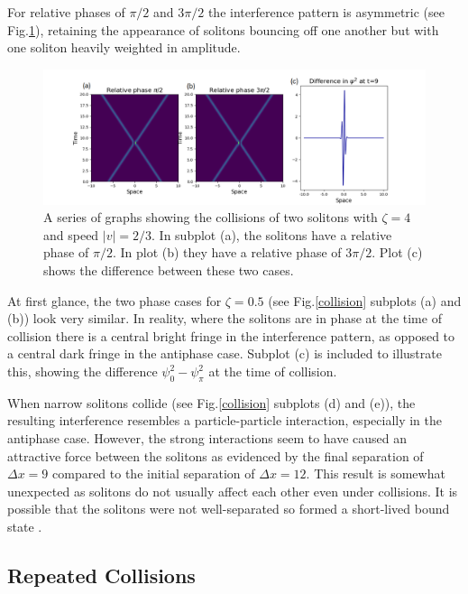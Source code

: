 \documentclass[10pt, twocolumn]{revtex4}    %
\begin{document}
For relative phases of $\pi/2$ and $3\pi/2$ the interference pattern is asymmetric (see Fig.\ref{asymmetric}), retaining the appearance of solitons bouncing off one another but with one soliton heavily weighted in amplitude. 

\begin{figure}
\includegraphics[width=\textwidth]{asymmetrical_collision.png}
\caption{A series of graphs showing the collisions of two solitons with $\zeta=4$ and speed $|v|=2/3$. In subplot (a), the solitons have a relative phase of $\pi/2$. In plot (b) they have a relative phase of $3\pi/2$. Plot (c) shows the difference between these two cases.}
\label{asymmetric}
\end{figure}

At first glance, the two phase cases for $\zeta=0.5$ (see Fig.\ref{collision} subplots (a) and (b)) look very similar. In reality, where the solitons are in phase at the time of collision there is a central bright fringe in the interference pattern, as opposed to a central dark fringe in the antiphase case. Subplot (c) is included to illustrate this, showing the difference $\psi_0^2 - \psi_{\pi}^2$ at the time of collision. 

When narrow solitons collide (see Fig.\ref{collision} subplots (d) and (e)), the resulting interference resembles a particle-particle interaction, especially in the antiphase case. However, the strong interactions seem to have caused an attractive force between the solitons as evidenced by the final separation of $\Delta x = 9$ compared to the initial separation of $\Delta x=12$. This result is somewhat unexpected as solitons do not usually affect each other even under collisions. It is possible that the solitons were not well-separated so formed a short-lived bound state \cite{Bound}.


\subsection{Repeated Collisions}
\end{document}
